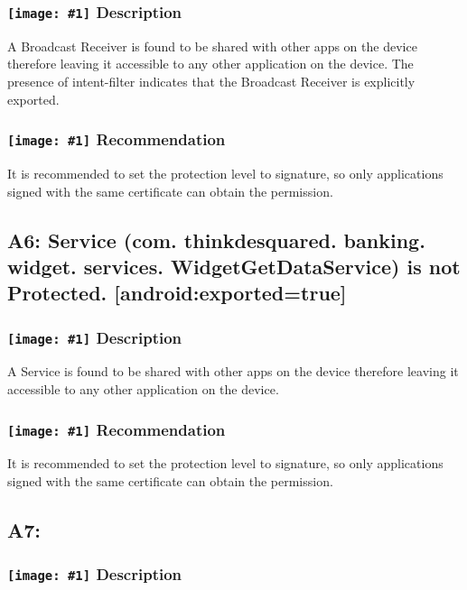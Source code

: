 \documentclass[12p]{article}
\newcommand{\icon}[1]{\texttt{[image: \#1]}}
\begin{document}
\subsubsection*{\protect\icon{/home/miki/Documents/GITHUB/AndroidPermissions/python/vulns/report_icons/basic_sheet.png} Description}
A  Broadcast Receiver is found to be shared with other apps on the device therefore leaving it accessible to any other application on the device. The presence of intent-filter indicates that the Broadcast Receiver is explicitly exported.
\subsubsection*{\protect\icon{/home/miki/Documents/GITHUB/AndroidPermissions/python/vulns/report_icons/basic_todo.png} Recommendation}
It is recommended to set the protection level to signature, so only applications signed with the same certificate can obtain the permission.
\subsection{A6: Service (com. thinkdesquared. banking. widget. services. WidgetGetDataService) is not Protected. [android:exported=true]}
\subsubsection*{\protect\icon{/home/miki/Documents/GITHUB/AndroidPermissions/python/vulns/report_icons/basic_sheet.png} Description}
A Service is found to be shared with other apps on the device therefore leaving it accessible to any other application on the device.
\subsubsection*{\protect\icon{/home/miki/Documents/GITHUB/AndroidPermissions/python/vulns/report_icons/basic_todo.png} Recommendation}
It is recommended to set the protection level to signature, so only applications signed with the same certificate can obtain the permission.
\subsection{A7: }
\subsubsection*{\protect\icon{/home/miki/Documents/GITHUB/AndroidPermissions/python/vulns/report_icons/basic_sheet.png} Description}
\end{document}
